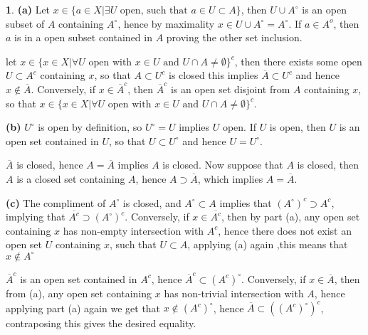 \documentclass[11pt]{article}
\theoremstyle{definition}
\newtheorem{pb}{}
\newcommand{\set}[1]{\{#1\}}
\newcommand{\tand}[1]{\text{ and }}
\begin{document}
    \begin{pb}
        \textbf{(a)} Let \(x \in \set{a\in X \vert \exists U \text{ open, such that } a \in U \subset A}\), then \(U \cup A^\circ\) is an open subset of \(A\) containing \(A^\circ\),
        hence by maximality \(x \in U \cup A^\circ = A^\circ\). If \(a \in A^o\), then \(a\) is in a open subset contained in \(A\) proving the other set inclusion.

        let \(x \in \set{x \in X \vert \forall U \text{ open with } x \in U \tand UU \cap A \neq \emptyset}^c\), then there exists some open \(U \subset A^c\) containing \(x\),
        so that \(A \subset U^c\) is closed this implies \(\overline{A} \subset U^c\) and hence \(x \not \in \overline{A}\). Conversely, if \(x \in \overline{A}^c\), then
        \(\overline{A}^c\) is an open set disjoint from \(A\) containing \(x\), so that \(x \in \set{x \in X \vert \forall U \text{ open with } x \in U \tand UU \cap A \neq \emptyset}^c\).

        \textbf{(b)} \(U^\circ\) is open by definition, so \(U^\circ = U\) implies \(U\) open. If \(U\) is open, then \(U\) is an open set contained in \(U\), so that \(U \subset U^\circ\) 
        and hence \(U = U^\circ\).

        \(\overline{A}\) is closed, hence \(A = \overline{A}\) implies \(A\) is closed. Now suppose that \(A\) is closed, then \(A\) is a closed set containing \(A\), hence
        \(A \supset \overline{A}\), which implies \(A = \overline{A}\).

        \textbf{(c)} The compliment of \(A^\circ\) is closed, and \(A^\circ \subset A\) implies that \(\left(A^\circ\right)^c \supset A^c\), implying that
        \(\overline{A^c} \supset \left(A^\circ\right)^c\). Conversely, if \(x \in \overline{A^c}\), then by part (a), any open set containing \(x\) has non-empty
        intersection with \(A^c\), hence there does not exist an open set \(U\) containing \(x\), such that \(U \subset A\), applying (a) again ,this means that
        \(x \not \in A^\circ\)

        \(\overline{A}^c\) is an open set contained in \(A^c\), hence \(\overline{A}^c \subset (A^c)^\circ\). Conversely, if \(x \in \overline{A}\), then from (a), any open set containing
        \(x\) has non-trivial intersection with \(A\), hence applying part (a) again we get that \(x \not \in (A^c)^\circ\), hence \(\overline{A} \subset \left((A^c)^\circ\right)^c\),
        contraposing this gives the desired equality.
    \end{pb}
\end{document}
